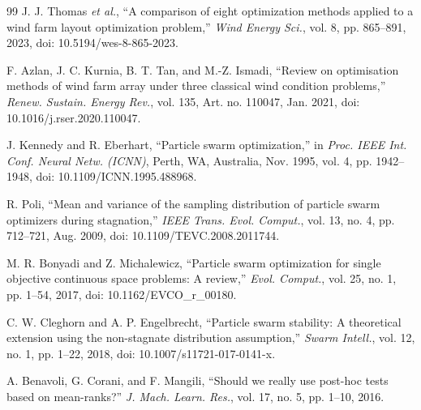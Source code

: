 \begin{thebibliography}{99}
J. J. Thomas \textit{et al.}, ``A comparison of eight optimization methods applied to a wind farm layout optimization problem,'' \textit{Wind Energy Sci.}, vol. 8, pp. 865--891, 2023, doi: 10.5194/wes-8-865-2023.

F. Azlan, J. C. Kurnia, B. T. Tan, and M.-Z. Ismadi, ``Review on optimisation methods of wind farm array under three classical wind condition problems,'' \textit{Renew. Sustain. Energy Rev.}, vol. 135, Art. no. 110047, Jan. 2021, doi: 10.1016/j.rser.2020.110047.

J. Kennedy and R. Eberhart, ``Particle swarm optimization,'' in \textit{Proc. IEEE Int. Conf. Neural Netw. (ICNN)}, Perth, WA, Australia, Nov. 1995, vol. 4, pp. 1942--1948, doi: 10.1109/ICNN.1995.488968.

R. Poli, ``Mean and variance of the sampling distribution of particle swarm optimizers during stagnation,'' \textit{IEEE Trans. Evol. Comput.}, vol. 13, no. 4, pp. 712--721, Aug. 2009, doi: 10.1109/TEVC.2008.2011744.

M. R. Bonyadi and Z. Michalewicz, ``Particle swarm optimization for single objective continuous space problems: A review,'' \textit{Evol. Comput.}, vol. 25, no. 1, pp. 1--54, 2017, doi: 10.1162/EVCO\_r\_00180.

C. W. Cleghorn and A. P. Engelbrecht, ``Particle swarm stability: A theoretical extension using the non-stagnate distribution assumption,'' \textit{Swarm Intell.}, vol. 12, no. 1, pp. 1--22, 2018, doi: 10.1007/s11721-017-0141-x.

A. Benavoli, G. Corani, and F. Mangili, ``Should we really use post-hoc tests based on mean-ranks?'' \textit{J. Mach. Learn. Res.}, vol. 17, no. 5, pp. 1--10, 2016.


\end{thebibliography}
